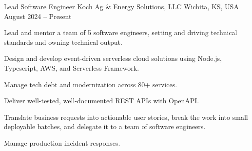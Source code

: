 
\begin{cventries}

	\cventry
	{Lead Software Engineer} %
	{Koch Ag \& Energy Solutions, LLC} %
	{Wichita, KS, USA} %
	{August 2024 -- Present} %
	{
		\begin{cvitems}
			\item Lead and mentor a team of 5 software engineers, setting and driving
			technical standards and owning technical output.
			\item Design and develop event-driven serverless cloud solutions using
			Node.js, Typescript, AWS, and Serverless Framework.
			\item Manage tech debt and modernization across 80+ services.
			\item Deliver well-tested, well-documented REST APIs with OpenAPI.
			\item Translate business requests into actionable user stories, break the
			work into small deployable batches, and delegate it to a team of software
			engineers.
			\item Manage production incident responses.
		\end{cvitems}
	}


\end{cventries}
